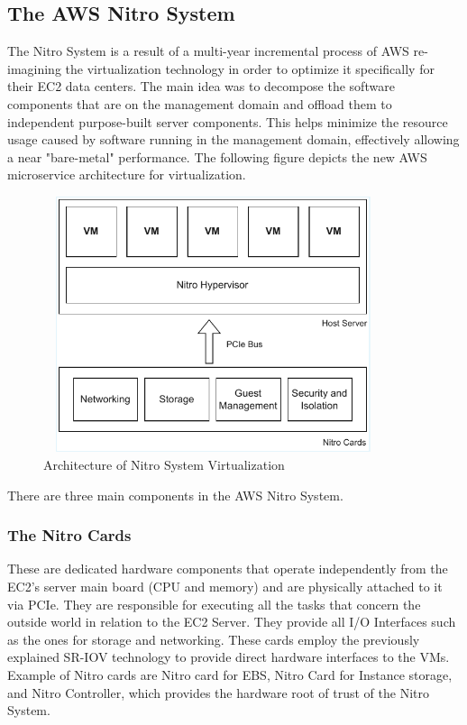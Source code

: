 \subsection{The AWS Nitro System}
The Nitro System is a result of a multi-year incremental process of AWS re-imagining the virtualization 
technology in order to optimize it specifically for their EC2 data centers. The main idea was to decompose 
the software components that are on the management domain and offload them to independent purpose-built server 
components. This helps minimize the resource usage caused by software running in the management domain, 
effectively allowing a near "bare-metal" performance. The following figure depicts the new AWS microservice 
architecture for virtualization. 
\begin{figure}[H]
  \centering
  \includegraphics[width=10cm, height=7.5cm]{figures/nitro}
  \caption{Architecture of Nitro System Virtualization}
  \label{fig:nitro}
\end{figure}
\noindent
There are three main components in the AWS Nitro System. 
\subsubsection{The Nitro Cards}
These are dedicated hardware components that operate independently from the EC2's server main board 
(CPU and memory) and are physically attached to it via PCIe. They are responsible for executing all the 
tasks that concern the outside world in relation to the EC2 Server. They provide all I/O Interfaces such 
as the ones for storage and networking. These cards employ the previously explained SR-IOV technology to provide direct hardware 
interfaces to the VMs. Example of Nitro cards are Nitro card for EBS, Nitro Card for Instance storage, and 
Nitro Controller, which provides the hardware root of trust of the Nitro System. 
